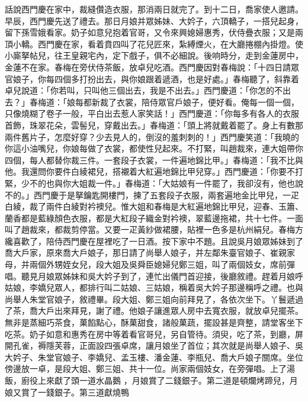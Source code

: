 \begin{showcontents}{}
話說西門慶在家中，裁縫儹造衣服，那消兩日就完了。到十二日，喬家使人邀請。早辰，西門慶先送了禮去。那日月娘并眾姊妹、大妗子，六頂轎子，一搭兒起身，留下孫雪娥看家。奶子如意兒抱着官哥，又令來興媳婦惠秀，伏侍疊衣服；又是兩頂小轎。西門慶在家，看着賁四叫了花兒匠來，紮縛煙火，在大廳捲棚內掛燈。使小廝拏帖兒，往王皇親宅內，定下戲子，俱不必細說。後响時分，走到金蓮房中，金蓮不在家。春梅在旁伏侍茶飯，放卓兒吃酒。西門慶因對春梅說：「十四日請眾官娘子，你每四個多打扮出去，與你娘跟着遞酒，也是好處。」春梅聽了，斜靠着卓兒說道：「你若叫，只叫他三個出去，我是不出去。」西門慶道：「你怎的不出去？」春梅道：「娘每都新裁了衣裳，陪侍眾官戶娘子，便好看。俺每一個一個，只像燒糊了卷子一般，平白出去惹人家笑話！」西門慶道：「你每多有各人的衣服首飾，珠翠花朵，雲髻兒，穿戴出去。」春梅道：「頭上將就戴着罷了。身上有數那兩件舊片子，怎麼好穿？少去見人的，倒沒的羞刺刺的！」西門慶笑道：「我曉的你這小油嘴兒，你娘每做了衣裳，都使性兒起來。不打緊，叫趙裁來，連大姐帶你四個，每人都替你裁三件。一套段子衣裳，一件遍地錦比甲。」春梅道：「我不比與他。我還問你要件白綾裙兒，搭襯着大紅遍地錦比甲兒穿。」西門慶道：「你要不打緊，少不的也與你大姐裁一件。」春梅道：「大姑娘有一件罷了，我卻沒有，他也說不的。」西門慶于是拏鑰匙開樓門，揀了五套段子衣服，兩套遍地金比甲兒，一疋白綾，裁了兩件白綾對衿襖兒。惟大姐和春梅是大紅遍地錦比甲兒，迎春、玉簫、蘭香都是藍綠顏色衣服，都是大紅段子織金對衿襖，翠藍邊拖裙，共十七件。一面叫了趙裁來，都裁剪停當。又要一疋黃紗做裙腰，貼裡一色多是杭州絹兒。春梅方纔喜歡了，陪侍西門慶在屋裡吃了一日酒。按下家中不題。且說吳月娘眾姊妹到了喬大戶家，原來喬大戶娘子，那日請了尚舉人娘子，并左鄰朱臺官娘子、崔親家母，并兩個外甥姪女兒，段大姐及吳舜臣媳婦兒鄭三姐，叫了兩個妓女，席前彈唱。聽見月娘眾姊妹和吳大妗子到了，連忙出儀門首迎接，後廳敘禮。趕着月娘呼姑娘，李嬌兒眾人，都排行叫二姑娘、三姑娘，稱着吳大妗子那邊稱呼之禮。也與尚舉人朱堂官娘子，敘禮畢。段大姐、鄭三姐向前拜見了，各依次坐下。丫鬟遞過了茶，喬大戶出來拜見，謝了禮。他娘子讓進眾人房中去寬衣服，就放卓兒擺茶。無非是蒸細巧茶食，菓餡點心，酥菓甜食，諸般菓蔬，擺設甚是齊整，請堂客坐下吃茶。奶子如意和惠秀在房中等着看官哥兒，另自管待。須臾，吃了茶，到廳，屏開孔雀，褥隱芙蓉，正面設四張卓席，讓月娘坐了首位；其次就是尚舉人娘子、吳大妗子、朱堂官娘子、李嬌兒、孟玉樓、潘金蓮、李瓶兒、喬大戶娘子關席。坐位傍邊放一卓，是段大姐、鄭三姐、共十一位。尚家兩個妓女，在旁彈唱。上了湯飯，廚役上來獻了頭一道水晶鵝 ，月娘賞了二錢銀子。第二道是頓爛烤蹄兒，月娘又賞了一錢銀子。第三道獻燒鴨 
\end{showcontents}
